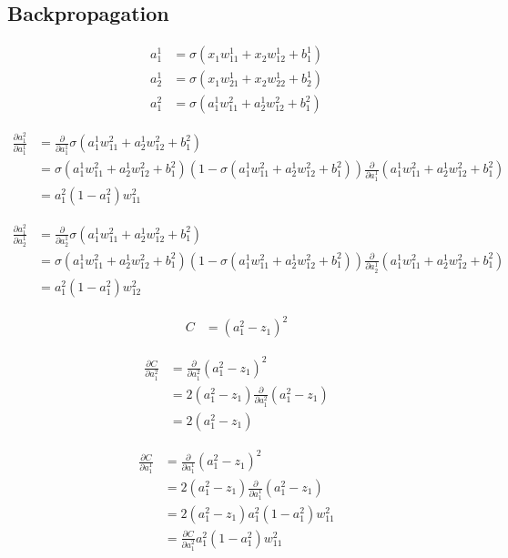 \documentclass{article}
\begin{document}
\subsection{Backpropagation}

\begin{align*}
a^1_1 &= \sigma(x_1 w^1_{11} + x_2 w^1_{12} + b^1_1)\\
a^1_2 &= \sigma(x_1 w^1_{21} + x_2 w^1_{22} + b^1_2)\\
a^2_1 &= \sigma(a^1_1 w^2_{11} + a^1_2 w^2_{12} + b^2_1)
\end{align*}

\begin{align*}
\frac{\partial a^2_1}{\partial a^1_1} &= \frac{\partial}{\partial a^1_1} \sigma(a^1_1 w^2_{11} + a^1_2 w^2_{12} + b^2_1)\\
&= \sigma(a^1_1 w^2_{11} + a^1_2 w^2_{12} + b^2_1)(1 - \sigma(a^1_1 w^2_{11} + a^1_2 w^2_{12} + b^2_1)) \frac{\partial}{\partial a^1_1} (a^1_1 w^2_{11} + a^1_2 w^2_{12} + b^2_1)\\
&= a^2_1 (1 - a^2_1) w^2_{11}
\end{align*}

\begin{align*}
\frac{\partial a^2_1}{\partial a^1_2} &= \frac{\partial}{\partial a^1_2} \sigma(a^1_1 w^2_{11} + a^1_2 w^2_{12} + b^2_1)\\
&= \sigma(a^1_1 w^2_{11} + a^1_2 w^2_{12} + b^2_1)(1 - \sigma(a^1_1 w^2_{11} + a^1_2 w^2_{12} + b^2_1)) \frac{\partial}{\partial a^1_2} (a^1_1 w^2_{11} + a^1_2 w^2_{12} + b^2_1)\\
&= a^2_1 (1 - a^2_1) w^2_{12}
\end{align*}

\begin{align*}
C &= (a^2_1 - z_1)^2
\end{align*}

\begin{align*}
\frac{\partial C}{\partial a^2_1} &= \frac{\partial}{\partial a^2_1} (a^2_1 - z_1)^2\\
&= 2 (a^2_1 - z_1) \frac{\partial}{\partial a^2_1} (a^2_1 - z_1)\\
&= 2 (a^2_1 - z_1)
\end{align*}

\begin{align*}
\frac{\partial C}{\partial a^1_1} &= \frac{\partial}{\partial a^1_1} (a^2_1 - z_1)^2\\
&= 2 (a^2_1 - z_1) \frac{\partial}{\partial a^1_1} (a^2_1 - z_1)\\
&= 2 (a^2_1 - z_1) a^2_1 (1 - a^2_1) w^2_{11}\\
&= \frac{\partial C}{\partial a^2_1} a^2_1 (1 - a^2_1) w^2_{11}
\end{align*}
\end{document}
